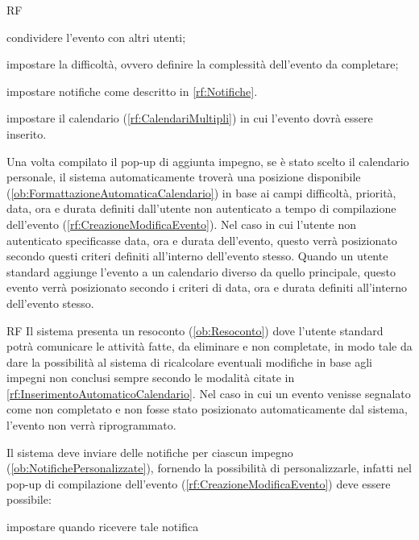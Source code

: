 \begin{listaPersonale}{RF}
\begin{listaPersonale2}[RF]{}
		 condividere l'evento con altri utenti;

		 impostare la difficoltà, ovvero definire la complessità dell'evento da completare;

		 impostare notifiche come descritto in \ref{rf:Notifiche}.

		 impostare il calendario (\ref{rf:CalendariMultipli}) in cui l'evento dovrà essere inserito.
	\end{listaPersonale2}

	 Una volta compilato il pop-up di aggiunta impegno, se è stato scelto il calendario personale, il sistema automaticamente troverà una posizione disponibile (\ref{ob:FormattazioneAutomaticaCalendario}) in base ai campi difficoltà, priorità, data, ora e durata definiti dall'utente non autenticato a tempo di compilazione dell'evento (\ref{rf:CreazioneModificaEvento}). Nel caso in cui l'utente non autenticato specificasse data, ora e durata dell'evento, questo verrà posizionato secondo questi criteri definiti all'interno dell'evento stesso. Quando un utente standard aggiunge l'evento a un calendario diverso da quello principale, questo evento verrà posizionato secondo i criteri di data, ora e durata definiti all'interno dell'evento stesso.
	\begin{listaPersonale2}{RF}
		 Il sistema presenta un resoconto (\ref{ob:Resoconto}) dove l'utente standard potrà comunicare le attività fatte, da eliminare e non completate, in modo tale da dare la possibilità al sistema di ricalcolare eventuali modifiche in base agli impegni non conclusi sempre secondo le modalità citate in \ref{rf:InserimentoAutomaticoCalendario}. Nel caso in cui un evento venisse segnalato come non completato e non fosse stato posizionato automaticamente dal sistema, l'evento non verrà riprogrammato.
	\end{listaPersonale2}

	 Il sistema deve inviare delle notifiche per ciascun impegno (\ref{ob:NotifichePersonalizzate}), fornendo la possibilità di personalizzarle, infatti nel pop-up di compilazione dell'evento (\ref{rf:CreazioneModificaEvento}) deve essere possibile:
	\begin{listaPersonale2}[RF]{}
		 impostare quando ricevere tale notifica


\end{listaPersonale2}
\end{listaPersonale}
